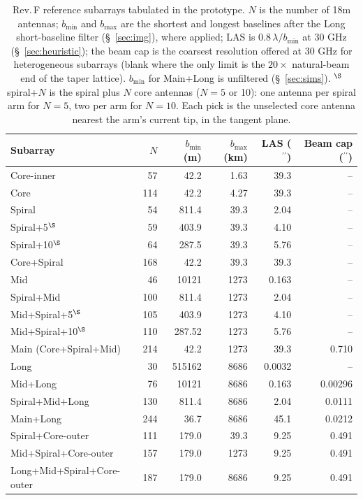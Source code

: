 \documentclass[11pt]{article}
\newcommand{\arcsec}{^{\prime\prime}}
\begin{document}
\begin{table}[tb]
\centering
\small
\caption{Rev.\,F reference subarrays tabulated in the prototype.
  $N$ is the number of 18m antennas; $b_{\min}$ and $b_{\max}$ are
  the shortest and longest baselines after the Long short-baseline
  filter (\S~\ref{sec:img}), where applied; LAS is $0.8\,\lambda/b_{\min}$ at 30 GHz
  (\S~\ref{sec:heuristic}); the beam cap is the coarsest resolution
  offered at 30 GHz for heterogeneous subarrays (blank where the only
  limit is the $20\times$ natural-beam end of the taper lattice).
  $b_{\min}$ for Main+Long is unfiltered (\S~\ref{sec:sims}).
\small $^{\S}$spiral+$N$ is the spiral plus $N$ core antennas ($N=5$ or 10): one
antenna per spiral arm for $N=5$, two per arm for $N=10$.  Each pick is the
unselected core antenna nearest the arm's current tip, in the tangent plane.}
\label{tab:subarrays}
\begin{tabular}{@{}lrrrrr@{}}
\toprule
Subarray & $N$ & $b_{\min}$ (m) & $b_{\max}$ (km) & LAS ($\arcsec$) & Beam cap ($\arcsec$) \\
\midrule
Core-inner                 &  57 &    42.2 &     1.63 & 39.3   & --      \\
Core                       & 114 &    42.2 &     4.27 & 39.3   & --      \\
Spiral                     &  54 &   811.4 &    39.3  & 2.04   & --      \\
Spiral+5$^{\S}$ & 59 & 403.9 & 39.3 & 4.10 & -- \\
Spiral+10$^{\S}$ & 64 & 287.5 & 39.3 & 5.76 & -- \\
Core+Spiral                & 168 &    42.2 &    39.3  & 39.3   & --      \\
Mid                        &  46 & 10121   &  1273    & 0.163  & --      \\
Spiral+Mid                 & 100 &   811.4 &  1273    & 2.04   & --      \\
Mid+Spiral+5$^{\S}$ & 105 & 403.9 & 1273 & 4.10 & -- \\
Mid+Spiral+10$^{\S}$ & 110 & 287.52 & 1273 & 5.76 & -- \\
Main (Core+Spiral+Mid)     & 214 &    42.2 &  1273    & 39.3   & 0.710   \\
Long                       &  30 & 515162  &  8686    & 0.0032 & --      \\
Mid+Long                   &  76 & 10121   &  8686    & 0.163  & 0.00296 \\
Spiral+Mid+Long            & 130 &   811.4 &  8686    & 2.04   & 0.0111  \\
Main+Long                  & 244 &    36.7 &  8686    & 45.1   & 0.0212  \\
Spiral+Core-outer          & 111 &   179.0 &    39.3  & 9.25   & 0.491   \\
Mid+Spiral+Core-outer      & 157 &   179.0 &  1273    & 9.25   & 0.491   \\
Long+Mid+Spiral+Core-outer & 187 &   179.0 &  8686    & 9.25   & 0.491   \\
\bottomrule
\end{tabular}
\end{table}
\end{document}
